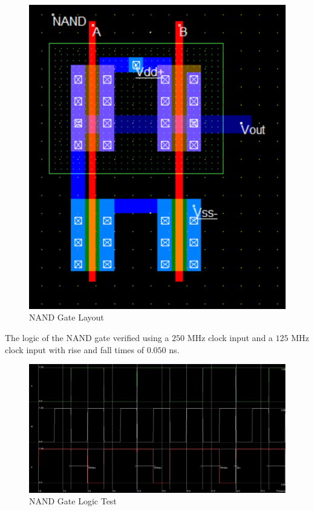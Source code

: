 \FloatBarrier

\begin{figure}[h!]
	\centering
	\includegraphics[scale=0.70]{../images/nand_layout.PNG}
	\caption{NAND Gate Layout}
	\label{fig:nand_layout}
\end{figure}

\FloatBarrier

The logic of the NAND gate verified using a $250$ \si{\mega\hertz} clock input and a $125$ \si{\mega\hertz} clock input with rise and fall times of $0.050$ \si{\nano\second}.

\FloatBarrier

\begin{figure}[h!]
	\centering
	\includegraphics[scale=0.30]{../images/nand_logic_test.PNG}
	\caption{NAND Gate Logic Test}
	\label{fig:inverter_layout_vtc}
\end{figure}

